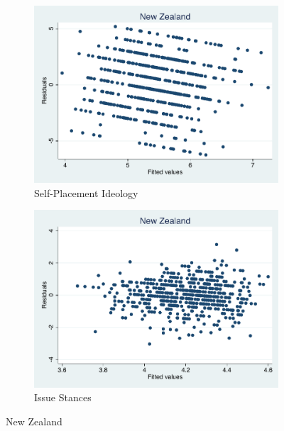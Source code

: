 \documentclass[12pt, titlepage]{article}
\begin{document}
\begin{figure}[H]
	\centering
	\begin{subfigure}[b]{0.475\textwidth}   
		\centering 
		\includegraphics[width=\textwidth]{Residuals/CountryIdeo/NZealand}
		\caption{Self-Placement Ideology}
	\end{subfigure}
	\hfill
	\begin{subfigure}[b]{0.475\textwidth}
		\centering 
		\includegraphics[width=\textwidth]{Residuals/CountryLib/NZealand}
		\caption{Issue Stances}
	\end{subfigure}
	\caption{New Zealand}
	\label{NZealand}
\end{figure}
\end{document}
